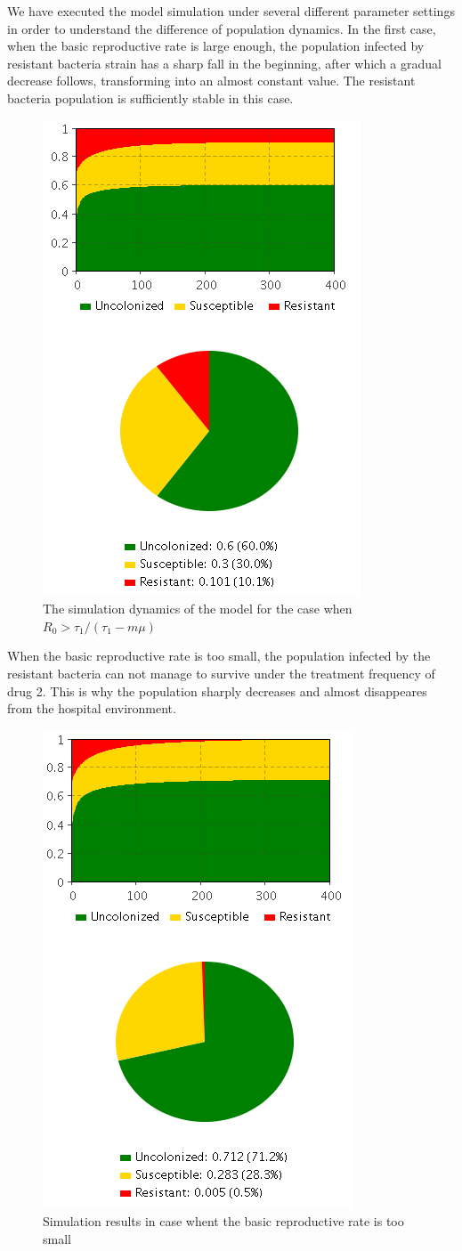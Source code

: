 We have executed the model simulation under several different parameter settings in order to understand the difference of population dynamics. In the first case, when the basic reproductive rate is large enough, the population infected by resistant bacteria strain has a sharp fall in the beginning, after which a gradual decrease follows, transforming into an almost constant value. The resistant bacteria population is sufficiently stable in this case.

\begin{figure}[H]
  \centering
  \includegraphics[height=0.7\textwidth]{img/screens/result/result1}
  \caption{The simulation dynamics of the model for the case when $R_0 > \tau_1/(\tau_1 - m \mu)$}
\end{figure}

When the basic reproductive rate is too small, the population infected by the resistant bacteria can not manage to survive under the treatment frequency of drug 2. This is why the population sharply decreases and almost disappeares from the hospital environment.

\begin{figure}[H]
  \centering
  \includegraphics[height=0.7\textwidth]{img/screens/result/result2}
  \caption{Simulation results in case whent the basic reproductive rate is too small}
\end{figure}

